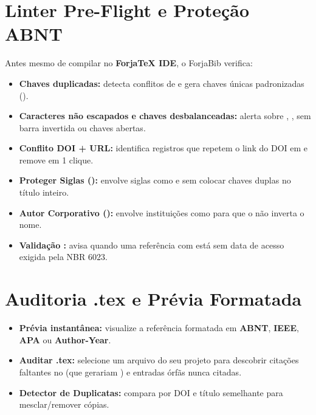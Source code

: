 \documentclass[11pt,a4paper]{article}
\begin{document}
\section{Linter Pre-Flight e Proteção ABNT}
Antes mesmo de compilar no \textbf{ForjaTeX IDE}, o ForjaBib verifica:
\begin{itemize}
  \item \textbf{Chaves duplicadas:} detecta conflitos de  e gera chaves únicas padronizadas ().
  \item \textbf{Caracteres não escapados e chaves desbalanceadas:} alerta sobre \code{\&}, \code{\%}, \code{\#} sem barra invertida ou chaves \code{\{\}} abertas.
  \item \textbf{Conflito DOI + URL:} identifica registros que repetem o link do DOI em  e remove em 1 clique.
  \item \textbf{Proteger Siglas ():} envolve siglas como  e  sem colocar chaves duplas no título inteiro.
  \item \textbf{Autor Corporativo ():} envolve instituições como  para que o  não inverta o nome.
  \item \textbf{Validação :} avisa quando uma referência com  está sem data de acesso exigida pela NBR 6023.
\end{itemize}

\section{Auditoria .tex e Prévia Formatada}
\begin{itemize}
  \item \textbf{Prévia instantânea:} visualize a referência formatada em \textbf{ABNT}, \textbf{IEEE}, \textbf{APA} ou \textbf{Author-Year}.
  \item \textbf{Auditar .tex:} selecione um arquivo  do seu projeto para descobrir citações faltantes no  (que gerariam \code{[?]}) e entradas órfãs nunca citadas.
  \item \textbf{Detector de Duplicatas:} compara por DOI e título semelhante para mesclar/remover cópias.
\end{itemize}
\end{document}

